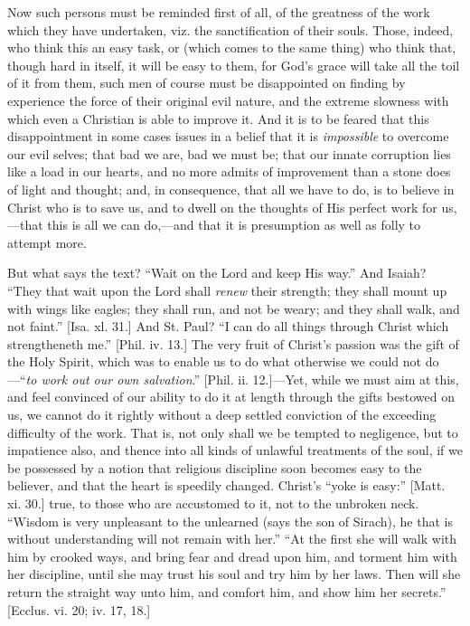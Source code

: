 Now such persons must be reminded first of all, of the
greatness of the work which they have undertaken, viz.
the sanctification of their souls. Those, indeed, who
think this an easy task, or (which comes to the same
thing) who think that, though hard in itself, it will be
easy to them, for God's grace will take all the toil of
it from them, such men of course must be disappointed on
finding by experience the force of their original evil
nature, and the extreme slowness with which even a
Christian is able to improve it. And it is to be feared
that this disappointment in some cases issues in a belief
that it is \emph{impossible} to overcome our evil selves;
that bad we are, bad we must be; that our innate
corruption lies like a load in our hearts, and no more
admits of improvement than a stone does of light and
thought; and, in consequence, that all we have to do, is
to believe in Christ who is to save us, and to dwell on
the thoughts of His perfect work for us,—that this
is all we can do,—and that it is presumption as well
as folly to attempt more.

But what says the text? ``Wait on the Lord and
keep His way.'' And Isaiah? ``They that wait upon
the Lord shall \emph{renew} their strength; they shall
mount up with wings like eagles; they shall run, and not
be weary; and they shall walk, and not faint.'' [Isa.
xl. 31.] And St. Paul? ``I can do all things through
Christ which strengtheneth me.'' [Phil. iv. 13.] The
very fruit of Christ's passion was the gift of the Holy
Spirit, which was to enable us to do what otherwise we
could not do—``\emph{to work out our own salvation}.''
[Phil. ii. 12.]—Yet, while we must aim at this, and
feel convinced of our ability to do it at length through
the gifts bestowed on us, we cannot do it rightly without
a deep settled conviction of the exceeding difficulty of
the work. That is, not only shall we be tempted to
negligence, but to impatience also, and thence into all
kinds of unlawful treatments of the soul, if we be
possessed by a notion that religious discipline soon
becomes easy to the believer, and that the heart is
speedily changed. Christ's ``yoke is easy:''
[Matt. xi. 30.] true, to those who are accustomed to it,
not to the unbroken neck. ``Wisdom is very unpleasant
to the unlearned (says the son of Sirach), he that is
without understanding will not remain with her.''
``At the first she will walk with him by crooked
ways, and bring fear and dread upon him, and torment him
with her discipline, until she may trust his soul and try
him by her laws. Then will she return the straight way
unto him, and comfort him, and show him her
secrets.'' [Ecclus. vi. 20; iv. 17, 18.]

